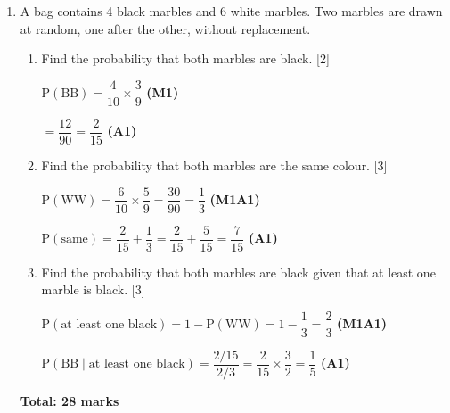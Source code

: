 \documentclass[12pt, twoside]{article}
\begin{document}
\begin{enumerate}[itemsep=0.1cm]
\newpage

\item A bag contains 4 black marbles and 6 white marbles. Two marbles are
drawn at random, one after the other, without replacement.

\begin{enumerate}[itemsep=0.3cm]
  \item Find the probability that both marbles are black. \hfill [2]

  $\mathrm{P}(\text{BB}) = \dfrac{4}{10} \times \dfrac{3}{9}$ \hfill \textbf{(M1)}

  $= \dfrac{12}{90} = \dfrac{2}{15}$ \hfill \textbf{(A1)}

  \item Find the probability that both marbles are the same colour. \hfill [3]

  $\mathrm{P}(\text{WW}) = \dfrac{6}{10} \times \dfrac{5}{9} = \dfrac{30}{90} = \dfrac{1}{3}$ \hfill \textbf{(M1A1)}

  $\mathrm{P}(\text{same}) = \dfrac{2}{15} + \dfrac{1}{3}
    = \dfrac{2}{15} + \dfrac{5}{15} = \dfrac{7}{15}$ \hfill \textbf{(A1)}

  \item Find the probability that both marbles are black given that
        at least one marble is black. \hfill [3]

  $\mathrm{P}(\text{at least one black}) = 1 - \mathrm{P}(\text{WW})
    = 1 - \dfrac{1}{3} = \dfrac{2}{3}$ \hfill \textbf{(M1A1)}

  $\mathrm{P}(\text{BB} \mid \text{at least one black})
    = \dfrac{2/15}{2/3} = \dfrac{2}{15} \times \dfrac{3}{2} = \dfrac{1}{5}$ \hfill \textbf{(A1)}
\end{enumerate}

\bigskip
\noindent\textbf{Total: 28 marks}

\end{enumerate}
\end{document}
